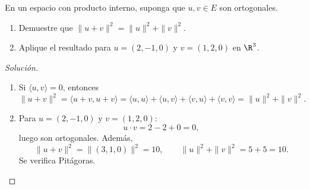 \documentclass[a4,11pt]{aleph-notas}
\begin{document}
\begin{ejer}
    En un espacio con producto interno, suponga que $u,v\in E$ son ortogonales.
    \begin{enumerate}
        \item Demuestre que $\|u+v\|^2=\|u\|^2+\|v\|^2$.
        \item Aplique el resultado para $u=(2,-1,0)$ y $v=(1,2,0)$ en $\R^3$.
    \end{enumerate}
\end{ejer}

\begin{proof}[Solución]\hspace{0pt}
    \begin{enumerate}
        \item Si $\langle u,v\rangle=0$, entonces
        \[
            \|u+v\|^2=\langle u+v,u+v\rangle
            =\langle u,u\rangle+\langle u,v\rangle+\langle v,u\rangle+\langle v,v\rangle
            =\|u\|^2+\|v\|^2.
        \]
        \item Para $u=(2,-1,0)$ y $v=(1,2,0)$:
        \[
            u\cdot v=2-2+0=0,
        \]
        luego son ortogonales. Además,
        \[
            \|u+v\|^2=\|(3,1,0)\|^2=10,
            \qquad
            \|u\|^2+\|v\|^2=5+5=10.
        \]
        Se verifica Pitágoras.
    \end{enumerate}
\end{proof}
\end{document}
